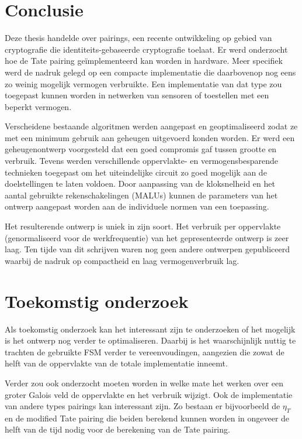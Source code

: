 
\section{Conclusie}

Deze thesis handelde over pairings, een recente ontwikkeling op gebied van cryptografie die identiteits-gebaseerde cryptografie toelaat. Er werd onderzocht hoe de Tate pairing ge\"implementeerd kan worden in hardware. Meer specifiek werd de nadruk gelegd op een compacte implementatie die daarbovenop nog eens zo weinig mogelijk vermogen verbruikte. Een implementatie van dat type zou toegepast kunnen worden in netwerken van sensoren of toestellen met een beperkt vermogen.

Verscheidene bestaande algoritmen werden aangepast en geoptimaliseerd zodat ze met een minimum gebruik aan geheugen uitgevoerd konden worden. Er werd een geheugenontwerp voorgesteld dat een goed compromis gaf tussen grootte en verbruik. Tevens werden verschillende oppervlakte- en vermogensbesparende technieken toegepast om het uiteindelijke circuit zo goed mogelijk aan de doelstellingen te laten voldoen. Door aanpassing van de kloksnelheid en het aantal gebruikte rekenschakelingen (MALUs) kunnen de parameters van het ontwerp aangepast worden aan de individuele normen van een toepassing.

Het resulterende ontwerp is uniek in zijn soort. Het verbruik per oppervlakte (genormaliseerd voor de werkfrequentie) van het gepresenteerde ontwerp is zeer laag. Ten tijde van dit schrijven waren nog geen andere ontwerpen gepubliceerd waarbij de nadruk op compactheid en laag vermogenverbruik lag.

\section{Toekomstig onderzoek}

Als toekomstig onderzoek kan het interessant zijn te onderzoeken of het mogelijk is het ontwerp nog verder te optimaliseren. Daarbij is het waarschijnlijk nuttig te trachten de gebruikte FSM verder te vereenvoudingen, aangezien die zowat de helft van de oppervlakte van de totale implementatie inneemt.

Verder zou ook onderzocht moeten worden in welke mate het werken over een groter Galois veld de oppervlakte en het verbruik wijzigt. Ook de implementatie van andere types pairings kan interessant zijn. Zo bestaan er bijvoorbeeld de $\eta_T$ en de modified Tate pairing die beiden berekend kunnen worden in ongeveer de helft van de tijd nodig voor de berekening van de Tate pairing.
